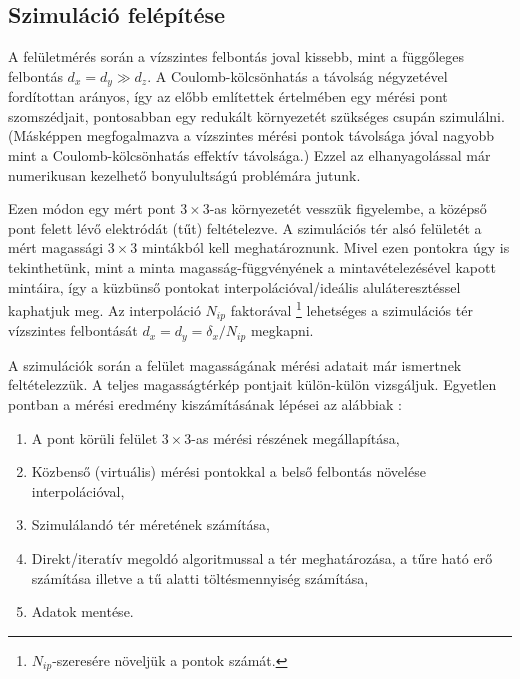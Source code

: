 	

\subsection{Szimuláció felépítése} \label{sec:felepites}
	
	A felületmérés során a vízszintes felbontás joval kissebb, mint a függőleges felbontás
	$d_x=d_y \gg d_z$. A Coulomb-kölcsönhatás a távolság négyzetével fordítottan arányos,
	így az előbb említettek értelmében egy mérési pont szomszédjait, pontosabban egy redukált
	környezetét szükséges csupán szimulálni. (Másképpen megfogalmazva a vízszintes mérési pontok
	távolsága jóval nagyobb mint a Coulomb-kölcsönhatás effektív távolsága.) Ezzel az elhanyagolással
	már numerikusan kezelhető bonyulultságú problémára jutunk.
	
	Ezen módon egy mért pont $3\times3$-as környezetét vesszük figyelembe,
	a középső pont felett lévő elektródát (tűt) feltételezve.
	A szimulációs tér alsó felületét a mért magassági $3\times 3$ mintákból kell meghatároznunk.
	Mivel ezen pontokra úgy is tekinthetünk, mint a minta magasság-függvényének a mintavételezésével
	kapott mintáira, így a küzbünső pontokat interpolációval/ideális aluláteresztéssel kaphatjuk meg.
	Az interpoláció $N_{ip}$ faktorával \footnote{$N_{ip}$-szeresére növeljük a pontok számát.}
	lehetséges a szimulációs tér vízszintes felbontását $d_x=d_y = \delta_x / N_{ip}$ megkapni.

	A szimulációk során a felület magasságának mérési adatait már ismertnek feltételezzük.
	A teljes magasságtérkép pontjait külön-külön vizsgáljuk.
	Egyetlen pontban a mérési eredmény kiszámításának lépései az alábbiak :
	
	\begin{enumerate}
		\item A pont körüli felület $3\times3$-as mérési részének megállapítása,
		\item Közbenső (virtuális) mérési pontokkal a belső felbontás növelése
		interpolációval,
		\item Szimulálandó tér méretének számítása,
		\item Direkt/iteratív megoldó algoritmussal a tér meghatározása, 
				a tűre ható erő számítása illetve a tű alatti töltésmennyiség számítása,
		\item Adatok mentése.
	\end{enumerate}
	

	